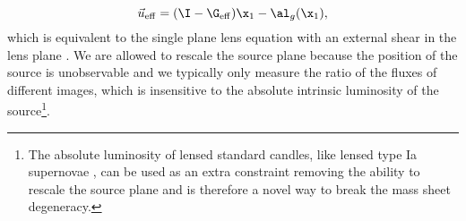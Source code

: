 \begin{equation}
\vec{u}_{\rm eff} = (\I - \G_{\rm eff}) \x_1 - \al_g(\x_1),
\end{equation}
which is equivalent to the single plane lens equation with an external shear in the lens plane \citep[see also ][]{Schneider97}. We are allowed to rescale the source plane because the position of the source is unobservable and we typically only measure the ratio of the fluxes of different images, which is insensitive to the absolute intrinsic luminosity of the source\footnote{The absolute luminosity of lensed standard candles, like lensed type Ia supernovae \citep{Patel14, Kolatt98}, can be used as an extra constraint removing the ability to rescale the source plane and is therefore a novel way to break the mass sheet degeneracy.}.
  